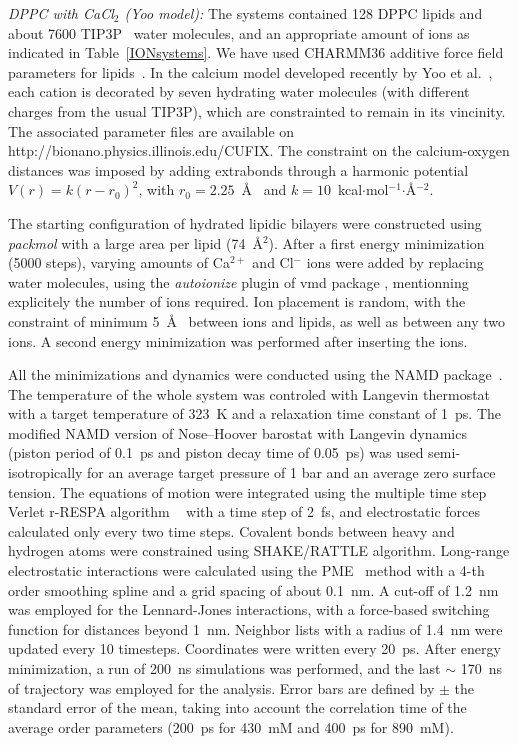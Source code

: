 \documentclass[twoside,twocolumn,9pt]{article}
\begin{document}
{\it DPPC with CaCl$_2$ (Yoo model):}
The systems contained 128 DPPC lipids and about 7600 TIP3P~\cite{jorgensen83} water molecules,
and an appropriate amount of ions as indicated in  Table~\ref{IONsystems}.  
We have used CHARMM36 additive force field parameters for lipids~\cite{klauda10}. 
In the calcium model developed recently by Yoo et al.~\cite{yoo16}, 
each cation is decorated by seven hydrating water molecules (with different charges from the usual TIP3P),
which are constrainted to remain in its vincinity. The associated parameter files are available
on http://bionano.physics.illinois.edu/CUFIX. The constraint on the calcium-oxygen distances
was imposed by adding extrabonds through a harmonic potential $V(r) = k(r-r_0)^2$, 
with $r_0=2.25$~\AA~ and $k=10$~kcal$\cdot$mol$^{-1}$$\cdot$\AA$^{-2}$.
 
The starting  configuration of hydrated lipidic bilayers were constructed using {\it packmol} \cite{packmol} 
with a large area per lipid (74~\AA$^{2}$). 
After a first energy minimization (5000 steps),
varying amounts of Ca$^{2+}$ and Cl$^-$ ions were added  by replacing water molecules,
using the {\it autoionize} plugin of vmd package \cite{hump96},
mentionning explicitely the number of ions required.
Ion placement is random, with the constraint of  minimum 5~\AA~ between ions and lipids,
as well as between any two ions. A second energy minimization was performed after inserting the ions.
 
All the minimizations and dynamics were conducted using the NAMD package~\cite{NAMD}.
The temperature of the whole system was controled with Langevin thermostat with a target temperature of 323~K 
and a relaxation time constant of 1~ps.  The modified NAMD version of Nose--Hoover barostat with Langevin dynamics
(piston period of 0.1~ps and piston decay time of 0.05~ps) was used semi-isotropically
for an average target pressure of 1 bar and an average zero surface tension. 
The equations of motion were integrated using the multiple time step Verlet r-RESPA algorithm ~\cite{pall13}
with a time step of 2~fs, and electrostatic forces calculated only every two time steps. Covalent
bonds between heavy and hydrogen atoms were constrained using SHAKE/RATTLE algorithm.
Long-range electrostatic interactions were calculated using the PME~\cite{darden93,essman95} method 
with a 4-th order smoothing spline and a grid spacing of about 0.1~nm.
A cut-off of 1.2~nm was employed for the Lennard-Jones
interactions, with a force-based switching function for distances beyond 1~nm. Neighbor
lists with a radius of 1.4~nm were updated every 10 timesteps.
Coordinates were written every 20~ps. After energy minimization, a run of  200~ns simulations was performed,
and the last $\sim$ 170~ns 
of  trajectory was employed for the analysis.
Error bars are defined by $\pm$ the standard error of the mean, 
taking into account the correlation time of the average order parameters 
(200~ps for 430~mM and 400~ps for 890~mM). 
\end{document}
